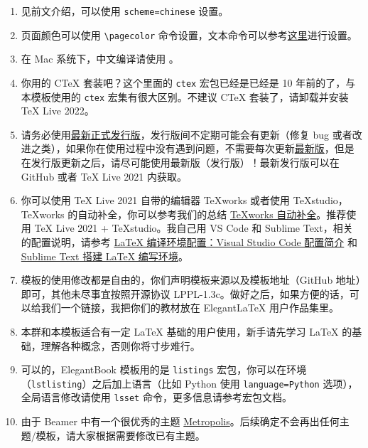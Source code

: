 \documentclass[lang=cn,10pt]{elegantbook}
\begin{document}
\begin{enumerate}[itemsep=1.5ex]
  \item {}
    见前文介绍，可以使用 \lstinline{scheme=chinese} 设置。
  \item {}
    页面颜色可以使用 \lstinline{\pagecolor} 命令设置，文本命令可以参考\href{https://tex.stackexchange.com/questions/278544/xcolor-what-is-the-equivalent-of-default-text-color}{这里}进行设置。
  \item {}
    在 Mac 系统下，中文编译请使用 。
  \item {}
    你用的 C\TeX{} 套装吧？这个里面的 \lstinline{ctex} 宏包已经是已经是 10 年前的了，与本模板使用的 \lstinline{ctex} 宏集有很大区别。不建议 C\TeX{} 套装了，请卸载并安装 \TeX{} Live 2022。
  \item {}
    请务必使用\href{https://github.com/ElegantLaTeX/ElegantBook/releases}{最新正式发行版}，发行版间不定期可能会有更新（修复 bug 或者改进之类），如果你在使用过程中没有遇到问题，不需要每次更新\href{https://github.com/ElegantLaTeX/ElegantBook/archive/master.zip}{最新版}，但是在发行版更新之后，请尽可能使用最新版（发行版）！最新发行版可以在 GitHub 或者 \TeX{} Live 2021 内获取。
  \item {}
    你可以使用 \TeX{} Live 2021 自带的编辑器 \TeX{}works 或者使用 \TeX{}studio，\TeX works 的自动补全，你可以参考我们的总结 \href{https://github.com/EthanDeng/texworks-autocomplete}{\TeX works 自动补全}。推荐使用 \TeX{} Live 2021 + \TeX{}studio。我自己用 VS Code 和 Sublime Text，相关的配置说明，请参考 \href{https://github.com/EthanDeng/vscode-latex}{\LaTeX{} 编译环境配置：Visual Studio Code 配置简介} 和 \href{https://github.com/EthanDeng/sublime-text-latex}{Sublime Text 搭建 \LaTeX{} 编写环境}。
  \item {}
    模板的使用修改都是自由的，你们声明模板来源以及模板地址（GitHub 地址）即可，其他未尽事宜按照开源协议 LPPL-1.3c。做好之后，如果方便的话，可以给我们一个链接，我把你们的教材放在 Elegant\LaTeX{} 用户作品集里。
  \item {}
    本群和本模板适合有一定 \LaTeX{} 基础的用户使用，新手请先学习 \LaTeX{} 的基础，理解各种概念，否则你将寸步难行。
  \item {}
    可以的，ElegantBook 模板用的是 \lstinline{listings} 宏包，你可以在环境（\lstinline{lstlisting}）之后加上语言（比如 Python 使用 \lstinline{language=Python} 选项），全局语言修改请使用 \lstinline{lsset} 命令，更多信息请参考宏包文档。
  \item {}
    由于 Beamer 中有一个很优秀的主题 \href{https://github.com/matze/mtheme}{Metropolis}。后续确定不会再出任何主题/模板，请大家根据需要修改已有主题。
\end{enumerate}
\end{document}
